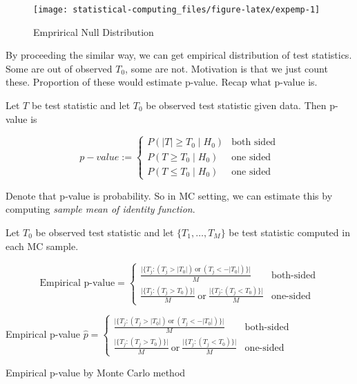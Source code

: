 \documentclass[]{book}
\theoremstyle{definition}
\theoremstyle{definition}
\theoremstyle{definition}
\theoremstyle{remark}
\let\BeginKnitrBlock\begin \let\EndKnitrBlock\end
\begin{document}
\begin{figure}[H]

{\centering \texttt{[image: statistical-computing\_files/figure-latex/expemp-1]} 

}

\caption{Emprirical Null Distribution}\label{fig:expemp}
\end{figure}

By proceeding the similar way, we can get empirical distribution of test statistics. Some are out of observed \(T_0\), some are not. Motivation is that we just count these. Proportion of these would estimate p-value. Recap what p-value is.

\BeginKnitrBlock{definition}[p-value]
\protect\hypertarget{def:pval}{}{\label{def:pval} {} }Let \(T\) be test statistic and let \(T_0\) be observed test statistic given data. Then p-value is

\[
p-value := \begin{cases}
  P(\lvert T \rvert \ge T_0 \mid H_0) & \text{both sided} \\
  P(T \ge T_0 \mid H_0) & \text{one sided} \\
  P(T \le T_0 \mid H_0) & \text{one sided}
\end{cases}
\]
\EndKnitrBlock{definition}

Denote that p-value is probability. So in MC setting, we can estimate this by computing \emph{sample mean of identity function}.

\BeginKnitrBlock{lemma}[Empirical p-value]
\protect\hypertarget{lem:emppval}{}{\label{lem:emppval} {} }Let \(T_0\) be observed test statistic and let \(\{ T_1, \ldots, T_M \}\) be test statistic computed in each MC sample.

\[
\text{Empirical p-value} = \begin{cases}
  \frac{\Big\lvert \{ T_j : (T_j > \lvert T_0 \rvert) \:\text{or}\: (T_j < -\lvert T_0 \rvert) \} \Big\rvert}{M} & \text{both-sided} \\
  \frac{\Big\lvert \{ T_j : (T_j > T_0 ) \} \Big\rvert}{M} \:\text{or}\: \frac{\Big\lvert \{ T_j : (T_j < T_0 ) \} \Big\rvert}{M} & \text{one-sided}
\end{cases}
\]
\EndKnitrBlock{lemma}

\begin{algorithm}[H] \label{alg:algpval}
  \SetAlgoLined
  Empirical p-value $\hat{p} = \begin{cases} \frac{\Big\lvert \{ T_j : (T_j > \lvert T_0 \rvert) \:\text{or}\: (T_j < -\lvert T_0 \rvert) \} \Big\rvert}{M} & \text{both-sided} \\ \frac{\Big\lvert \{ T_j : (T_j > T_0 ) \} \Big\rvert}{M} \:\text{or}\: \frac{\Big\lvert \{ T_j : (T_j < T_0 ) \} \Big\rvert}{M} & \text{one-sided} \end{cases}$\; \label{alg:empp}
  \caption{Empirical p-value by Monte Carlo method}
\end{algorithm}
\end{document}
